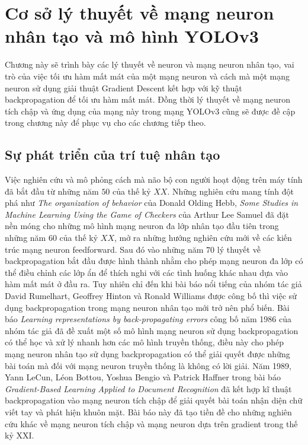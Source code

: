 \chapter{Cơ sở lý thuyết về mạng neuron nhân tạo và mô hình YOLOv3}
Chương này sẽ trình bày các lý thuyết về neuron và mạng neuron nhân tạo, vai trò của việc tối ưu hàm mất mát của một mạng neuron và cách mà một mạng neuron sử dụng giải thuật Gradient Descent kết hợp với kỹ thuật backpropagation để tối ưu hàm mất mát. Đồng thời lý thuyết về mạng neuron tích chập và ứng dụng của mạng này trong mạng YOLOv3 cũng sẽ được đề cập trong chương này để phục vụ cho các chương tiếp theo.
\section{Sự phát triển của trí tuệ nhân tạo}
Việc nghiên cứu và mô phỏng cách mà não bộ con người hoạt động trên máy tính đã bắt đầu từ những năm $50$ của thế kỷ $XX$. Những nghiên cứu mang tính đột phá như \textit{The organization of behavior}\cite{Hebb:1949} của Donald Olding Hebb, \textit{Some Studies in Machine Learning Using the Game of Checkers}\cite{Arthur:1959:IBM} của Arthur Lee Samuel đã đặt nền móng cho những mô hình mạng neuron đa lớp nhân tạo đầu tiên trong những năm $60$ của thế kỷ $XX$, mở ra những hướng nghiên cứu mới về các kiến trúc mạng neuron feedforward. Sau đó vào những năm $70$ lý thuyết về backpropagation bắt đầu được hình thành nhằm cho phép mạng neuron đa lớp có thể điều chỉnh các lớp ẩn để thích nghi với các tình huống khác nhau dựa vào hàm mất mát ở đầu ra. Tuy nhiên chỉ đến khi bài báo nổi tiếng của nhóm tác giả David Rumelhart, Geoffrey Hinton và Ronald Williams được công bố thì việc sử dụng backpropagation trong mạng neuron nhân tạo mới trở nên phổ biến. Bài báo \textit{Learning representations by back-propagating errors}\cite{DavidEtAl:1986} công bố năm 1986 của nhóm tác giả đã đề xuất một số mô hình mạng neuron sử dụng backpropagation có thể học và xử lý nhanh hơn các mô hình truyền thống, điều này cho phép mạng neuron nhân tạo sử dụng backpropagation có thể giải quyết được những bài toán mà đối với mạng neuron truyền thống là không có lời giải. Năm 1989, Yann LeCun, Léon Bottou, Yoshua Bengio và Patrick Haffner trong bài báo \textit{Gradient-Based Learning Applied to Document Recognition}\cite{LeCunEtAl:1998} đã kết hợp kĩ thuật backpropagation vào mạng neuron tích chập để giải quyết bài toán nhận diện chữ viết tay và phát hiện khuôn mặt. Bài báo này đã tạo tiền đề cho những nghiên cứu khác về mạng neuron tích chập và mạng neuron dựa trên gradient trong thế kỷ XXI.
